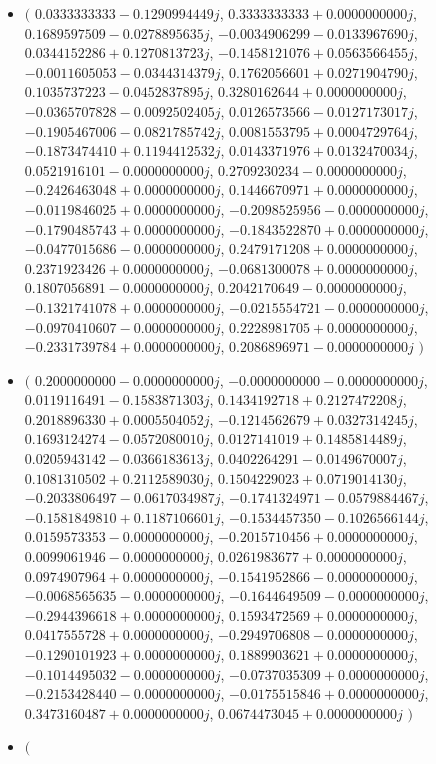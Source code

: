 \documentclass[14pt,a4paper]{article}
\begin{document}
\begin{itemize}
\item
$\big($
$0.0333333333-0.1290994449j$, $0.3333333333+0.0000000000j$, $0.1689597509-0.0278895635j$, $-0.0034906299-0.0133967690j$, $0.0344152286+0.1270813723j$, $-0.1458121076+0.0563566455j$, $-0.0011605053-0.0344314379j$, $0.1762056601+0.0271904790j$, $0.1035737223-0.0452837895j$, $0.3280162644+0.0000000000j$, $-0.0365707828-0.0092502405j$, $0.0126573566-0.0127173017j$, $-0.1905467006-0.0821785742j$, $0.0081553795+0.0004729764j$, $-0.1873474410+0.1194412532j$, $0.0143371976+0.0132470034j$, $0.0521916101-0.0000000000j$, $0.2709230234-0.0000000000j$, $-0.2426463048+0.0000000000j$, $0.1446670971+0.0000000000j$, $-0.0119846025+0.0000000000j$, $-0.2098525956-0.0000000000j$, $-0.1790485743+0.0000000000j$, $-0.1843522870+0.0000000000j$, $-0.0477015686-0.0000000000j$, $0.2479171208+0.0000000000j$, $0.2371923426+0.0000000000j$, $-0.0681300078+0.0000000000j$, $0.1807056891-0.0000000000j$, $0.2042170649-0.0000000000j$, $-0.1321741078+0.0000000000j$, $-0.0215554721-0.0000000000j$, $-0.0970410607-0.0000000000j$, $0.2228981705+0.0000000000j$, $-0.2331739784+0.0000000000j$, $0.2086896971-0.0000000000j$
$\big)$
\item
$\big($
$0.2000000000-0.0000000000j$, $-0.0000000000-0.0000000000j$, $0.0119116491-0.1583871303j$, $0.1434192718+0.2127472208j$, $0.2018896330+0.0005504052j$, $-0.1214562679+0.0327314245j$, $0.1693124274-0.0572080010j$, $0.0127141019+0.1485814489j$, $0.0205943142-0.0366183613j$, $0.0402264291-0.0149670007j$, $0.1081310502+0.2112589030j$, $0.1504229023+0.0719014130j$, $-0.2033806497-0.0617034987j$, $-0.1741324971-0.0579884467j$, $-0.1581849810+0.1187106601j$, $-0.1534457350-0.1026566144j$, $0.0159573353-0.0000000000j$, $-0.2015710456+0.0000000000j$, $0.0099061946-0.0000000000j$, $0.0261983677+0.0000000000j$, $0.0974907964+0.0000000000j$, $-0.1541952866-0.0000000000j$, $-0.0068565635-0.0000000000j$, $-0.1644649509-0.0000000000j$, $-0.2944396618+0.0000000000j$, $0.1593472569+0.0000000000j$, $0.0417555728+0.0000000000j$, $-0.2949706808-0.0000000000j$, $-0.1290101923+0.0000000000j$, $0.1889903621+0.0000000000j$, $-0.1014495032-0.0000000000j$, $-0.0737035309+0.0000000000j$, $-0.2153428440-0.0000000000j$, $-0.0175515846+0.0000000000j$, $0.3473160487+0.0000000000j$, $0.0674473045+0.0000000000j$
$\big)$
\item
$\big($

\end{itemize}
\end{document}
